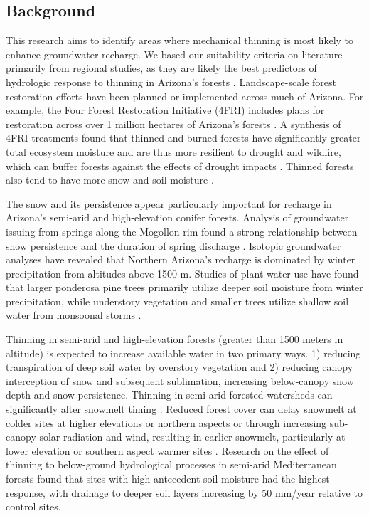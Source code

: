 \documentclass[
  number,
  preprint,
  3p,
  onecolumn]{elsarticle}
\begin{document}
\subsection{Background}\label{background}

This research aims to identify areas where mechanical thinning is most
likely to enhance groundwater recharge. We based our suitability
criteria on literature primarily from regional studies, as they are
likely the best predictors of hydrologic response to thinning in
Arizona's forests \citep{wyatt_estimating_2013}. Landscape-scale forest
restoration efforts have been planned or implemented across much of
Arizona. For example, the Four Forest Restoration Initiative (4FRI)
includes plans for restoration across over 1 million hectares of
Arizona's forests \citep{schultz_collaborative_2012}. A synthesis of
4FRI treatments found that thinned and burned forests have significantly
greater total ecosystem moisture and are thus more resilient to drought
and wildfire, which can buffer forests against the effects of drought
impacts \citep{sankey_thinning_2022, sankey_regionalscale_2021}. Thinned
forests also tend to have more snow and soil moisture
\citep{odonnell_vegetation_2021}.

The snow and its persistence appear particularly important for recharge
in Arizona's semi-arid and high-elevation conifer forests. Analysis of
groundwater issuing from springs along the Mogollon rim found a strong
relationship between snow persistence and the duration of spring
discharge \citep{donovan2022}. Isotopic groundwater analyses have
revealed that Northern Arizona's recharge is dominated by winter
precipitation from altitudes above 1500
m\citep{eastoe2007, eastoe2023, earman2006, blasch2006}. Studies of
plant water use have found that larger ponderosa pine trees primarily
utilize deeper soil moisture from winter precipitation, while understory
vegetation and smaller trees utilize shallow soil water from monsoonal
storms \citep{kerhoulas2013, kerhoulas2023}.

Thinning in semi-arid and high-elevation forests (greater than 1500
meters in altitude) is expected to increase available water in two
primary ways. 1) reducing transpiration of deep soil water by overstory
vegetation and 2) reducing canopy interception of snow and subsequent
sublimation, increasing below-canopy snow depth and snow persistence.
Thinning in semi-arid forested watersheds can significantly alter
snowmelt timing \citep{dwivedi2024}. Reduced forest cover can delay
snowmelt at colder sites at higher elevations or northern aspects or
through increasing sub-canopy solar radiation and wind, resulting in
earlier snowmelt, particularly at lower elevation or southern aspect
warmer sites \citep{biederman_recent_2015, dwivedi2024}. Research on the
effect of thinning to below-ground hydrological processes in semi-arid
Mediterranean forests found that sites with high antecedent soil
moisture had the highest response, with drainage to deeper soil layers
increasing by 50 mm/year relative to control
sites\citep{del_campo_effectiveness_2019}.
\end{document}
